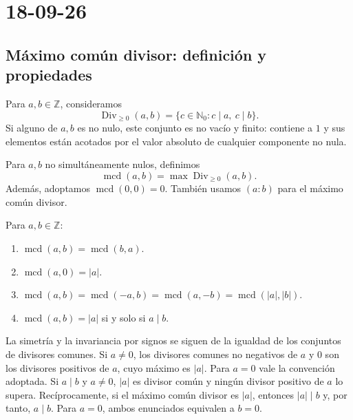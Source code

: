 \chapter{18-09-26}

\section{Máximo común divisor: definición y propiedades}
Para $a,b\in\mathbb Z$, consideramos
\[
\operatorname{Div}_{\geq0}(a,b)=\{c\in\mathbb N_0:c\mid a,\ c\mid b\}.
\]
Si alguno de $a,b$ es no nulo, este conjunto es no vacío y finito: contiene a $1$ y sus elementos están acotados por el valor absoluto de cualquier componente no nula.
\begin{definicion}[{title={Máximo común divisor}}]
Para $a,b$ no simultáneamente nulos, definimos
\[
\operatorname{mcd}(a,b)=\max\operatorname{Div}_{\geq0}(a,b).
\]
Además, adoptamos $\operatorname{mcd}(0,0)=0$. También usamos $(a:b)$ para el máximo común divisor.
\end{definicion}
\begin{proposicion}
Para $a,b\in\mathbb Z$:
\begin{enumerate}
\item $\operatorname{mcd}(a,b)=\operatorname{mcd}(b,a)$.
\item $\operatorname{mcd}(a,0)=|a|$.
\item $\operatorname{mcd}(a,b)=\operatorname{mcd}(-a,b)=\operatorname{mcd}(a,-b)=\operatorname{mcd}(|a|,|b|)$.
\item $\operatorname{mcd}(a,b)=|a|$ si y solo si $a\mid b$.
\end{enumerate}
\end{proposicion}
\begin{demostracion}
La simetría y la invariancia por signos se siguen de la igualdad de los conjuntos de divisores comunes. Si $a\neq0$, los divisores comunes no negativos de $a$ y $0$ son los divisores positivos de $a$, cuyo máximo es $|a|$. Para $a=0$ vale la convención adoptada.
Si $a\mid b$ y $a\neq0$, $|a|$ es divisor común y ningún divisor positivo de $a$ lo supera. Recíprocamente, si el máximo común divisor es $|a|$, entonces $|a|\mid b$ y, por tanto, $a\mid b$. Para $a=0$, ambos enunciados equivalen a $b=0$.
\end{demostracion}

